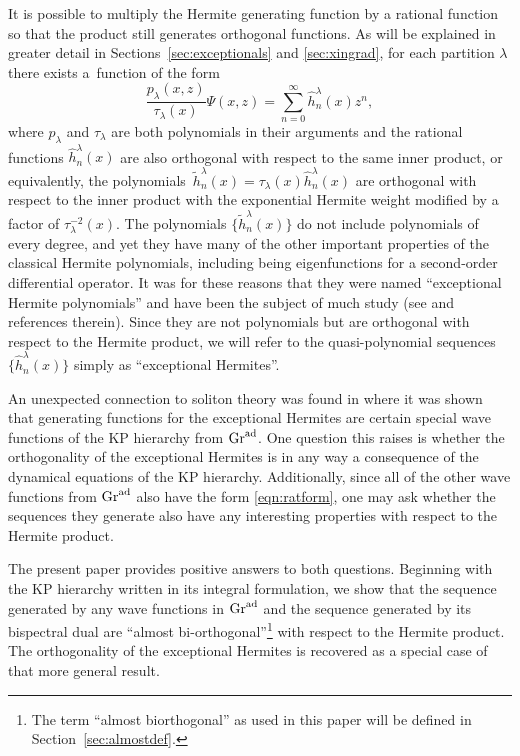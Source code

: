 \documentclass[10pt,a4paper]{amsart}
\numberwithin{equation}{section}
\theoremstyle{definition}
\begin{document}
 It is possible to multiply the Hermite generating function by a
 rational function so that the product still generates orthogonal functions.
As will be explained in greater detail in
Sections~\ref{sec:exceptionals} and \ref{sec:xingrad},
for each partition $\lambda$ there exists a~function of the form
 \begin{equation}
 \frac{p_{\lambda}(x,z)}{\tau_{\lambda}(x)}\Psi(x,z)=\sum_{n=0}^{\infty}\hat
 h_n^\lambda(x)z^n,\label{eqn:ratform}
\end{equation}
 where $p_{\lambda}$ and $\tau_{\lambda}$ are both polynomials in
 their arguments and the rational functions $\hat h_n^\lambda(x)$ are also
 orthogonal with respect to the same inner product, or equivalently, the polynomials~${\tilde h_n^\lambda(x)=\tau_{\lambda}(x)\hat h_n^{\lambda}(x)}$ are
 orthogonal with respect to the inner product with the exponential
 Hermite weight modified
 by a factor of $\tau_{\lambda}^{-2}(x)$.
The polynomials $\bigl\{\tilde h_n^\lambda(x)\bigr\}$ do not include
polynomials of every degree, and yet they have many of the other
important properties of the classical Hermite polynomials, including
being eigenfunctions for a second-order differential operator.
 It was
for these reasons that they were named ``exceptional Hermite
polynomials'' and have been the subject of much study (see
\cite{2014dry,XHermite1,XHermite2} and references therein). Since
they are not polynomials but are orthogonal with respect to the
Hermite product, we will refer to the quasi-polynomial sequences $\big\{\hat h_n^\lambda(x)\big\}$
simply as
``exceptional
 Hermites''.


An unexpected connection to soliton theory was found
in \cite{KasMil} where it was shown that generating functions
for the exceptional Hermites
are certain special wave functions of the KP hierarchy from ${\rm Gr}^{\rm ad}$.
One question this raises is whether the orthogonality of the
exceptional Hermites is in any way a consequence of the dynamical
equations of the KP hierarchy. Additionally, since all of the other
wave functions from ${\rm Gr}^{\rm ad}$ also have the form \eqref{eqn:ratform},
one may ask whether the sequences they generate also have any
interesting properties with respect to the Hermite product.

The present paper provides positive answers to both questions.
Beginning with the KP hierarchy written in its integral formulation,
we show that the sequence generated by any wave functions in
${\rm Gr}^{\rm ad}$ and the sequence generated by its bispectral dual are
``almost bi-orthogonal''\footnote{The term
 ``almost biorthogonal'' as used in this paper will be defined in Section~\ref{sec:almostdef}.}
with respect to the Hermite product. The orthogonality
of the exceptional Hermites is recovered as a special case of that
more general result.
\end{document}
